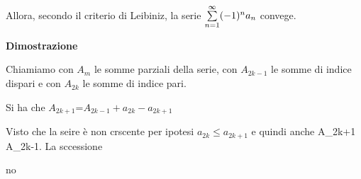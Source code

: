 Allora, secondo il criterio di Leibiniz, la serie $\sum\limits_{n=1}^{\infty}(-1)^n a_n$ convege.

\textbf{Dimostrazione}

Chiamiamo con $A_m$ le somme parziali della serie, con $A_{2k-1}$ le somme di indice dispari e con $A_{2k}$ le somme di indice pari.

Si ha che $A_{2k+1}$=$A_{2k-1}+a_{2k}-a_{2k+1}$

Visto che la seire è non crscente per ipotesi $a_{2k} \leq a_{2k+1}$ e quindi anche A_{2k+1} \leq A_{2k-1}. La sccessione


no


